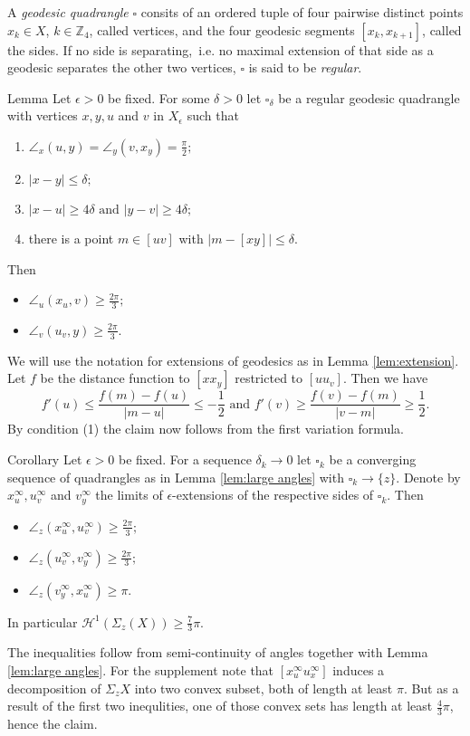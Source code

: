 \documentclass[a4paper,10pt]{amsart}
\begin{document}
A {\em geodesic quadrangle} $\square$ consits of an ordered tuple of four pairwise 
distinct points $x_k\in X$, $k\in\mathbb{Z}_4$, 
called vertices, and the four geodesic segments $[x_k,x_{k+1}]$, called the sides. 
If no side is separating,\ i.e. no maximal extension of that side as a geodesic 
separates the other two vertices, $\square$ is said to be {\em regular}.

\begin{thm}{Lemma}\label{lem:large angles}
Let $\epsilon>0$ be fixed. For some $\delta>0$ let $\square_\delta$ be a regular geodesic quadrangle with
vertices $x,y,u$ and $v$ in $X_\epsilon$ such that
\begin{enumerate}
	\item $\angle_x(u,y)=\angle_y(v,x_y)=\frac{\pi}{2};$
	\item $|x-y|\leq\delta;$
	\item $|x-u|\geq 4\delta\text{ and }|y-v|\geq 4\delta;$
	\item there is a point $m\in [uv]$ with $|m-[xy]|\leq \delta.$
\end{enumerate}
Then 
\begin{itemize}
\item $\angle_u(x_u,v)\geq\frac{2\pi}{3};$
\item $\angle_v(u_v,y)\geq\frac{2\pi}{3}.$
\end{itemize}
\end{thm}

We will use the notation for extensions of geodesics as in Lemma \ref{lem:extension}.
Let $f$ be the distance function to $[x x_y]$ restricted to $[u u_v]$. Then we have
$$
f'(u)\leq\frac{f(m)-f(u)}{|m-u|}\leq-\frac{1}{2}\text{  and  }f'(v)\geq\frac{f(v)-f(m)}{|v-m|}\geq\frac{1}{2}.
$$
By condition (1) the claim now follows from the first variation formula.
\qeds

\begin{thm}{Corollary}
Let $\epsilon>0$ be fixed. For a sequence $\delta_k\to 0$ let $\square_k$ be a converging sequence of quadrangles
as in Lemma \ref{lem:large angles} with $\square_k\to \{z\}$. Denote by $x^\infty_u, u^\infty_v$ and $v^\infty_y$
the limits of $\epsilon$-extensions of the respective sides of $\square_k$. Then
\begin{itemize}
\item $\angle_z(x^\infty_u,u^\infty_v)\geq\frac{2\pi}{3};$
\item $\angle_z(u^\infty_v,v^\infty_y)\geq\frac{2\pi}{3};$
\item $\angle_z(v^\infty_y,x^\infty_u)\geq\pi.$
\end{itemize}
In particular $\mathcal{H}^1(\Sigma_z(X))\geq\frac{7}{3}\pi$.
\end{thm}
The inequalities follow from semi-continuity of angles together with Lemma \ref{lem:large angles}.
For the supplement note that $[x^\infty_u u^\infty_x]$ induces a decomposition of $\Sigma_z X$ into two convex subset, both of length at least $\pi$.
But as a result of the first two inequlities, one of those convex sets has length at least $\frac{4}{3}\pi$, hence the claim.
\qeds
\end{document}
